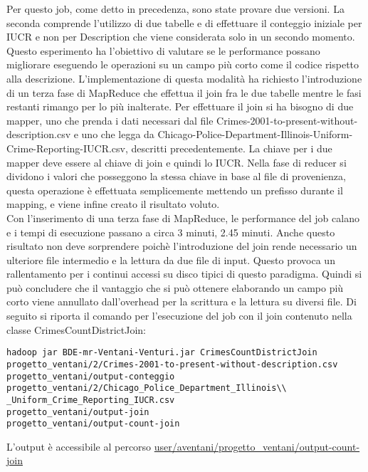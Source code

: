 \documentclass[10pt]{article}
\begin{document}
Per questo job, come detto in precedenza, sono state provare due versioni. La seconda comprende l'utilizzo di due tabelle e di effettuare il conteggio iniziale per IUCR e non per Description che viene considerata solo in un secondo momento. Questo esperimento ha l'obiettivo di valutare se le performance possano migliorare eseguendo le operazioni su un campo più corto come il codice rispetto alla descrizione.
L'implementazione di questa modalità ha richiesto l'introduzione di un terza fase di MapReduce che effettua il join fra le due tabelle mentre  le fasi restanti rimango per lo più inalterate. Per effettuare il join si ha bisogno di due mapper, uno che prenda i dati necessari dal file 
Crimes-2001-to-present-without-description.csv e uno che legga da Chicago-Police-Department-Illinois-Uniform-Crime-Reporting-IUCR.csv, descritti precedentemente. La chiave per i due mapper deve essere al chiave di join e quindi lo IUCR. Nella fase di reducer si dividono i valori che posseggono la stessa chiave in base al file di provenienza, questa operazione è effettuata semplicemente mettendo un prefisso durante il mapping, e viene infine creato il risultato voluto. \\
Con l'inserimento di una terza fase di MapReduce, le performance del job calano e i tempi di esecuzione passano a circa 3 minuti, 2.45 minuti.
Anche questo risultato non deve sorprendere poichè l'introduzione del join rende necessario un ulteriore file intermedio e la lettura da due file di input. Questo provoca un rallentamento per i continui accessi su disco tipici di questo paradigma. Quindi si può concludere che il vantaggio che si può ottenere elaborando un campo più corto viene annullato dall'overhead per la scrittura e la lettura su diversi file.
Di seguito si riporta il comando per l'esecuzione del job con il join contenuto nella classe CrimesCountDistrictJoin:
\begin{lstlisting}
hadoop jar BDE-mr-Ventani-Venturi.jar CrimesCountDistrictJoin 
progetto_ventani/2/Crimes-2001-to-present-without-description.csv 
progetto_ventani/output-conteggio 
progetto_ventani/2/Chicago_Police_Department_Illinois\\
_Uniform_Crime_Reporting_IUCR.csv
progetto_ventani/output-join   
progetto_ventani/output-count-join
\end{lstlisting}

L'output è accessibile al percorso \url{user/aventani/progetto_ventani/output-count-join} \\
\end{document}
